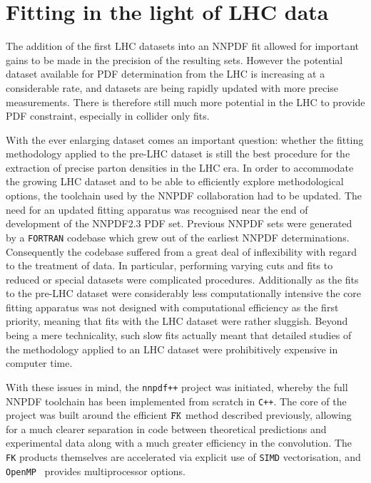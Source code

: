 \chapter{Fitting in the light of LHC data}
\label{ch:LHClight}
The addition of the first LHC datasets into an NNPDF fit allowed for important gains to be made in the precision of the resulting sets. However the potential dataset available for PDF determination from the LHC is increasing at a considerable rate, and datasets are being rapidly updated with more precise measurements. There is therefore still much more potential in the LHC to provide PDF constraint, especially in collider only fits.

With the ever enlarging dataset comes an important question: whether the fitting methodology applied to the pre-LHC dataset is still the best procedure for the extraction of precise parton densities in the LHC era. In order to accommodate the growing LHC dataset and to be able to efficiently explore methodological options, the toolchain used by the NNPDF collaboration had to be updated. The need for an updated fitting apparatus was recognised near the end of development of the NNPDF2.3 PDF set. Previous NNPDF sets were generated by a {\tt FORTRAN} codebase which grew out of the earliest NNPDF determinations. Consequently the codebase suffered from a great deal of inflexibility with regard to the treatment of data. In particular, performing varying cuts and fits to reduced or special datasets were complicated procedures. Additionally as the fits to the pre-LHC dataset were considerably less computationally intensive the core fitting apparatus was not designed with computational efficiency as the first priority, meaning that fits with the LHC dataset were rather sluggish. Beyond being a mere technicality, such slow fits actually meant that detailed studies of the methodology applied to an LHC dataset were prohibitively expensive in computer time.

With these issues in mind, the {\tt nnpdf++} project was initiated, whereby the full NNPDF toolchain has been implemented from scratch in {\tt C++}. The core of the project was built around the efficient $\tt FK$ method described previously, allowing for a much clearer separation in code between theoretical predictions and experimental data along with a much greater efficiency in the convolution. The {\tt FK} products themselves are accelerated via explicit use of {\tt SIMD} vectorisation, and {\tt OpenMP}~\cite{openmp08} provides multiprocessor options.


